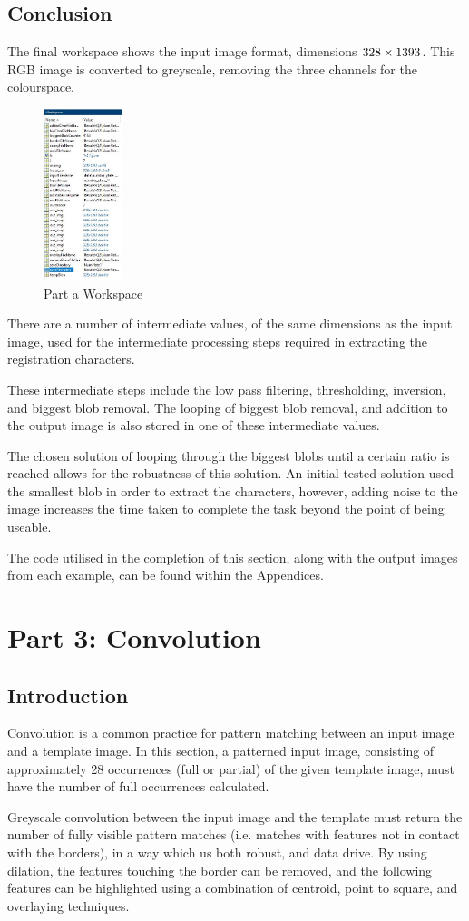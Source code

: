 \documentclass[a4paper]{article}
\begin{document}
	\subsection{Conclusion}
	The final workspace shows the input image format, dimensions $328 \times
	1393 \time 3$. This RGB image is converted to greyscale, removing the
	three channels for the colourspace.
	\begin{figure}[H]
		\centering
		\includegraphics[height=5cm]{Results/Q2/NumPlate6/Workspace.jpg}%
		\caption{Part a Workspace}
		\label{fig:}
	\end{figure}
	\par There are a number of intermediate values, of the same dimensions
	as the input image, used for the intermediate processing steps required
	in extracting the registration characters.
	\par These intermediate steps include the low pass filtering,
	thresholding, inversion, and biggest blob removal. The looping of
	biggest blob removal, and addition to the output image is also stored in
	one of these intermediate values.
	\par The chosen solution of looping through the biggest blobs until a
	certain ratio is reached allows for the robustness of this solution. An
	initial tested solution used the smallest blob in order to extract the
	characters, however, adding noise to the image increases the time taken
	to complete the task beyond the point of being useable.
	\par The code utilised in the completion of this section, along with the
	output images from each example, can be found within the Appendices.
	\section{Part 3: Convolution}
	\subsection{Introduction}
	Convolution is a common practice for pattern matching between an input
	image and a template image. In this section, a patterned input image,
	consisting of approximately 28 occurrences (full or partial) of the
	given template image, must have the number of full occurrences
	calculated.
	\par Greyscale convolution between the input image and the template must
	return the number of fully visible pattern matches (i.e. matches with
	features not in contact with the borders), in a way which us both
	robust, and data drive. By using dilation, the features touching the
	border can be removed, and the following features can be highlighted
	using a combination of centroid, point to square, and overlaying
	techniques.
\end{document}
